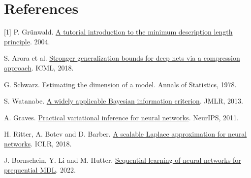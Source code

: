 \documentclass[10pt,a4paper]{article}
\begin{document}
\section*{References}
\vspace{-1mm}\setlength{\parskip}{2pt}
[1] P. Gr\"unwald. \href{https://arxiv.org/abs/math/0406077}{A tutorial introduction to the minimum description length principle}. 2004.\par
[2] S. Arora et al. \href{https://proceedings.mlr.press/v80/arora18b.html}{Stronger generalization bounds for deep nets via a compression approach}. ICML, 2018.\par
[3] G. Schwarz. \href{https://doi.org/10.1214/aos/1176344136}{Estimating the dimension of a model}. Annals of Statistics, 1978.\par
[4] S. Watanabe. \href{https://jmlr.org/papers/v14/watanabe13a.html}{A widely applicable Bayesian information criterion}. JMLR, 2013.\par
[5] A. Graves. \href{https://papers.nips.cc/paper/4329-practical-variational-inference-for-neural-networks}{Practical variational inference for neural networks}. NeurIPS, 2011.\par
[6] H. Ritter, A. Botev and D. Barber. \href{https://openreview.net/forum?id=Skdvd2xAZ}{A scalable Laplace approximation for neural networks}. ICLR, 2018.\par
[7] J. Bornschein, Y. Li and M. Hutter. \href{https://arxiv.org/abs/2210.07931}{Sequential learning of neural networks for prequential MDL}. 2022.
\end{document}
